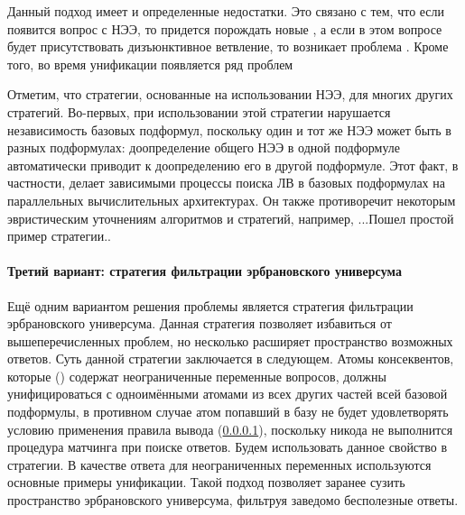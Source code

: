Данный подход имеет и определенные недостатки. Это связано с тем, что если появится вопрос с НЭЭ, то придется порождать новые , а если в этом вопросе будет присутствовать дизъюнктивное ветвление, то возникает проблема . Кроме того, во время унификации появляется ряд проблем  

Отметим, что стратегии, основанные на использовании НЭЭ,  для многих других стратегий. Во-первых, при использовании этой стратегии нарушается независимость базовых подформул, поскольку один и тот же НЭЭ может быть в разных подформулах: доопределение общего НЭЭ в одной подформуле автоматически приводит к доопределению его в другой подформуле. Этот факт, в частности, делает зависимыми процессы поиска ЛВ в базовых подформулах на параллельных вычислительных архитектурах. Он также противоречит некоторым эвристическим уточнениям алгоритмов и стратегий, например, {...}{Пошел простой пример стратегии.}.

\paragraph{Третий вариант: стратегия фильтрации эрбрановского универсума}
Ещё одним вариантом решения проблемы  является стратегия фильтрации эрбрановского универсума. Данная стратегия позволяет избавиться от вышеперечисленных проблем, но несколько расширяет пространство возможных ответов. Суть данной стратегии заключается в следующем. Атомы консеквентов, которые () содержат неограниченные переменные вопросов, должны унифицироваться с одноимёнными атомами из всех других частей всей базовой подформулы, в противном случае атом попавший в базу не будет удовлетворять условию применения правила вывода (\ref{}), поскольку никода не выполнится процедура матчинга при поиске ответов. Будем использовать данное свойство в стратегии. В качестве ответа для неограниченных переменных используются основные примеры унификации. Такой подход позволяет заранее сузить пространство эрбрановского универсума, фильтруя заведомо бесполезные ответы.

